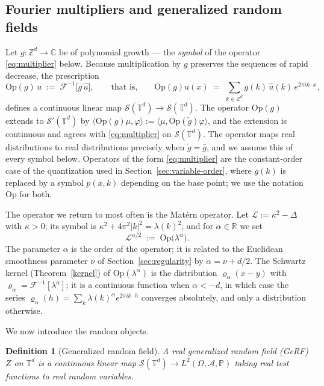 \documentclass[pdflatex,sn-mathphys,Numbered]{sn-jnl}
\theoremstyle{thmstyleone}%
\theoremstyle{thmstyletwo}%
\theoremstyle{thmstylethree}%
\newtheorem{definition}[theorem]{Definition}%
\newcommand{\RR}{\mathbb{R}}
\newcommand{\CC}{\mathbb{C}}
\newcommand{\ZZ}{\mathbb{Z}}
\newcommand{\TT}{\mathbb{T}}
\newcommand{\calL}{\mathcal{L}}
\newcommand{\calS}{\mathcal{S}}
\newcommand{\F}{\mathscr{F}}
\newcommand{\Op}{\mathrm{Op}}
\newcommand{\PP}{\mathbb{P}}
\begin{document}
\subsection{Fourier multipliers and generalized random fields}

Let $g : \ZZ^d \to \CC$ be of polynomial growth --- the \emph{symbol} of the
operator \eqref{eq:multiplier} below. Because multiplication by $g$
preserves the sequences of rapid decrease, the prescription
\begin{equation}\label{eq:multiplier}
    \Op(g)\,u \;:=\; \F^{-1}\bigl[g\,\hat u\bigr], \qquad\text{that is,}\qquad
    \Op(g)u(x) \;=\; \sum_{k\in\ZZ^d} g(k)\,\hat u(k)\, e^{2\pi i k\cdot x},
\end{equation}
defines a continuous linear map $\calS(\TT^d) \to \calS(\TT^d)$. The operator
$\Op(g)$ extends to $\calS'(\TT^d)$ by
$\langle \Op(g)\mu, \varphi\rangle := \langle \mu, \Op(\check g)\varphi\rangle$,
and the extension is continuous and agrees with \eqref{eq:multiplier} on
$\calS(\TT^d)$. The operator maps real
distributions to real distributions precisely when $\check g = \bar g$, and we
assume this of every symbol below. Operators of the form \eqref{eq:multiplier}
are the constant-order case of the quantization used in
Section~\ref{sec:variable-order}, where $g(k)$ is replaced by a symbol
$p(x,k)$ depending on the base point; we use the notation $\Op$ for both.

The operator we return to most often is the Mat\'ern operator. Let
$\calL := \kappa^2 - \Delta$ with $\kappa>0$; its symbol is
$\kappa^2 + 4\pi^2|k|^2 = \lambda(k)^2$, and for $\alpha \in \RR$ we set
\begin{equation}\label{eq:matern-op}
    \calL^{\alpha/2} \;:=\; \Op\bigl(\lambda^{\alpha}\bigr) .
\end{equation}
The parameter $\alpha$ is the order of the operator; it is related to the
Euclidean smoothness parameter $\nu$ of Section~\ref{sec:regularity} by
$\alpha = \nu + d/2$. The Schwartz kernel (Theorem~\ref{kernel}) of
$\Op(\lambda^\alpha)$ is
the distribution $\varrho_\alpha(x-y)$ with
$\varrho_\alpha = \F^{-1}[\lambda^\alpha]$; it is a continuous function when
$\alpha < -d$, in which case the series
$\varrho_\alpha(h) = \sum_{k}\lambda(k)^{\alpha}e^{2\pi i k\cdot h}$ converges
absolutely, and only a distribution otherwise.

We now introduce the random objects.

\begin{definition}[Generalized random field]\label{def:gerf}
A real generalized random field (GeRF) $Z$ on $\TT^d$ is a continuous linear map
$\calS(\TT^d) \to L^2(\Omega,\mathcal{A},\PP)$ taking real test functions to real
random variables.
\end{definition}
\end{document}
